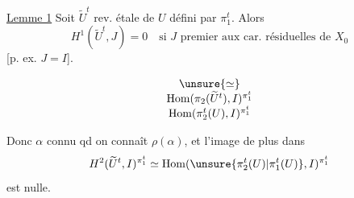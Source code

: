 \uline{Lemme 1} Soit $\widetilde U^t$ rev. étale de $U$ défini par
$\pi_1^t$. Alors
\[
H^1(\widetilde U^t,J)=0
\quad\text{si }J\text{ premier aux car. résiduelles de }X_0
\]
[p. ex. $J=I$].

\[
\begin{array}{c}
\unsure{\simeq}\\
\operatorname{Hom}(\pi_2(\widetilde U^t),I)^{\pi_1^t}\\
\operatorname{Hom}(\pi_2^t(U),I)^{\pi_1^t}
\end{array}
\]

Donc $\alpha$ connu qd on connaît
$\rho(\alpha)$, et l'image de plus dans
\[
H^2(\widetilde U^t,I)^{\pi_1^t}
\simeq\operatorname{Hom}(\unsure{\pi_2^t(U)|\pi_1^t(U)},I)^{\pi_1^t}
\]
est nulle.
